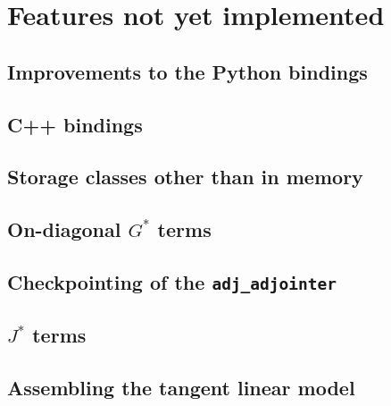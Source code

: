 \chapter{Features not yet implemented} \label{chap:todo}
\section{Improvements to the Python bindings}
\section{C++ bindings}
\section{Storage classes other than in memory}
\section{On-diagonal $G^*$ terms}
\section{Checkpointing of the \texttt{adj_adjointer}}
\section{$J^*$ terms}
\section{Assembling the tangent linear model}
